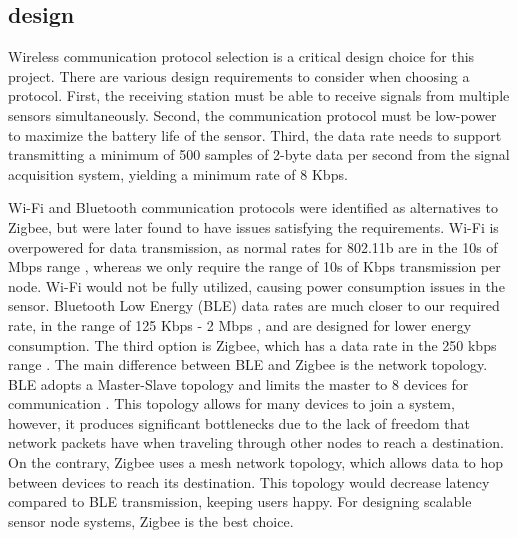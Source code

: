 \documentclass{article}
\begin{document}
\newpage
\subsection{\gls{design}}
Wireless communication protocol selection is a critical design choice for this project. There are various design requirements to consider when choosing a protocol. First, the receiving station must be able to receive signals from multiple sensors simultaneously. Second, the communication protocol must be low-power to maximize the battery life of the sensor. Third, the data rate needs to support transmitting a minimum of 500 samples of 2-byte data per second from the signal acquisition system, yielding a minimum rate of 8 Kbps. 

Wi-Fi and Bluetooth communication protocols were identified as alternatives to Zigbee, but were later found to have issues satisfying the requirements. Wi-Fi is overpowered for data transmission, as normal rates for 802.11b are in the 10s of Mbps range \cite{cisco}, whereas we only require the range of 10s of Kbps transmission per node. Wi-Fi would not be fully utilized, causing power consumption issues in the sensor. Bluetooth Low Energy (BLE) data rates are much closer to our required rate, in the range of 125 Kbps - 2 Mbps \cite{nordic}, and are designed for lower energy consumption. The third option is Zigbee, which has a data rate in the 250 kbps range \cite{ehub}. The main difference between BLE and Zigbee is the network topology. BLE adopts a Master-Slave topology and limits the master to 8 devices for communication \cite{ehub}. This topology allows for many devices to join a system, however, it produces significant bottlenecks due to the lack of freedom that network packets have when traveling through other nodes to reach a destination. On the contrary, Zigbee uses a mesh network topology, which allows data to hop between devices to reach its destination. This topology would decrease latency compared to BLE transmission, keeping users happy. For designing scalable sensor node systems, Zigbee is the best choice.
\end{document}

